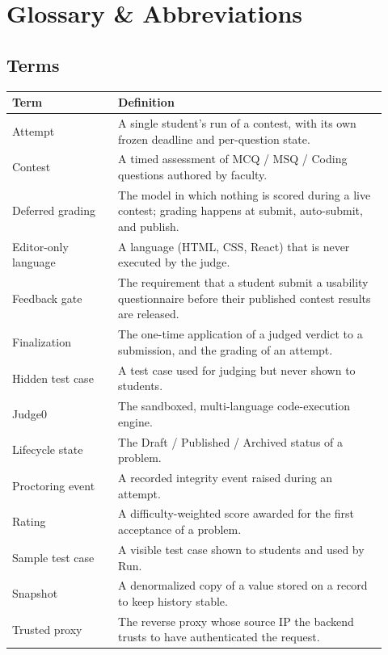 \documentclass[12pt,a4paper,oneside]{report}
\begin{document}
\chapter{Glossary \& Abbreviations}

\section{Terms}
\begin{longtable}{@{}p{0.26\linewidth} p{0.66\linewidth}@{}}
\toprule
\textbf{Term} & \textbf{Definition}\\
\midrule
\endhead
Attempt & A single student's run of a contest, with its own frozen deadline and per-question state.\\
Contest & A timed assessment of MCQ / MSQ / Coding questions authored by faculty.\\
Deferred grading & The model in which nothing is scored during a live contest; grading happens at submit, auto-submit, and publish.\\
Editor-only language & A language (HTML, CSS, React) that is never executed by the judge.\\
Feedback gate & The requirement that a student submit a usability questionnaire before their published contest results are released.\\
Finalization & The one-time application of a judged verdict to a submission, and the grading of an attempt.\\
Hidden test case & A test case used for judging but never shown to students.\\
Judge0 & The sandboxed, multi-language code-execution engine.\\
Lifecycle state & The Draft / Published / Archived status of a problem.\\
Proctoring event & A recorded integrity event raised during an attempt.\\
Rating & A difficulty-weighted score awarded for the first acceptance of a problem.\\
Sample test case & A visible test case shown to students and used by Run.\\
Snapshot & A denormalized copy of a value stored on a record to keep history stable.\\
Trusted proxy & The reverse proxy whose source IP the backend trusts to have authenticated the request.\\
\bottomrule
\end{longtable}
\end{document}

